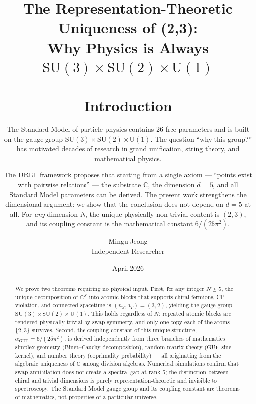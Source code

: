 \documentclass[12pt]{article}
\theoremstyle{remark}
\begin{document}
\title{The Representation-Theoretic Uniqueness of (2,3):\\Why Physics is Always $\text{SU}(3)\times\text{SU}(2)\times\text{U}(1)$
\author{Mingu Jeong\\Independent Researcher}
\date{April 2026}
\maketitle

\begin{abstract}
We prove two theorems requiring no physical input. First, for any integer $N \geq 5$, the unique decomposition of $\mathbb{C}^N$ into atomic blocks that supports chiral fermions, CP violation, and connected spacetime is $(n_S, n_T) = (3, 2)$, yielding the gauge group $\text{SU}(3)\times\text{SU}(2)\times\text{U}(1)$. This holds regardless of $N$: repeated atomic blocks are rendered physically trivial by swap symmetry, and only one copy each of the atoms $\{2, 3\}$ survives. Second, the coupling constant of this unique structure, $\alpha_\text{GUT} = 6/(25\pi^2)$, is derived independently from three branches of mathematics --- simplex geometry (Binet--Cauchy decomposition), random matrix theory (GUE sine kernel), and number theory (coprimality probability) --- all originating from the algebraic uniqueness of $\mathbb{C}$ among division algebras. Numerical simulations confirm that swap annihilation does not create a spectral gap at rank 5; the distinction between chiral and trivial dimensions is purely representation-theoretic and invisible to spectroscopy. The Standard Model gauge group and its coupling constant are theorems of mathematics, not properties of a particular universe.
\end{abstract}

\tableofcontents

\section{Introduction}

The Standard Model of particle physics contains 26 free parameters and is built on the gauge group $\text{SU}(3)\times\text{SU}(2)\times\text{U}(1)$. The question ``why this group?'' has motivated decades of research in grand unification, string theory, and mathematical physics.

The DRLT framework proposes that starting from a single axiom --- ``points exist with pairwise relations'' --- the substrate $\mathbb{C}$, the dimension $d = 5$, and all Standard Model parameters can be derived. The present work strengthens the dimensional argument: we show that the conclusion does not depend on $d = 5$ at all. For \emph{any} dimension $N$, the unique physically non-trivial content is $(2, 3)$, and its coupling constant is the mathematical constant $6/(25\pi^2)$.

}
\end{document}
